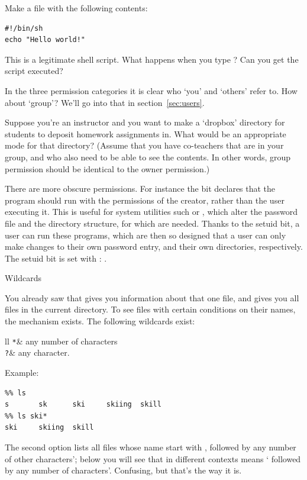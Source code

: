 Make a file  with the following contents:
\begin{lstlisting}
#!/bin/sh
echo "Hello world!"
\end{lstlisting}
This is a legitimate shell script. What happens when you type
? Can you get the script executed?

In the three permission categories it is clear who `you' and `others'
refer to. How about `group'? We'll go into that in section~\ref{sec:users}.

\begin{exercise}
  Suppose you're an instructor and you want to make a `dropbox'
  directory for students to deposit homework assignments in.
  What would be an appropriate mode for that directory?
  (Assume that you have co-teachers that are in your group,
  and who also need to be able to see the contents. In other words,
  group permission should be identical to the owner permission.)
\end{exercise}


\begin{remark}
  There are more obscure permissions. For instance the
   bit declares that the program should run with the
  permissions of the creator, rather than the user executing it. This
  is useful for system utilities such  or , which
  alter the password file and the directory structure, for which
   are needed. Thanks to the setuid
  bit, a user can run these programs, which are then so designed that
  a user can only make changes to their own password entry, and their
  own directories, respectively. The setuid bit is set with
  : .
\end{remark}

 {Wildcards}
\label{sec:shell-wildcard}

You already saw that  gives you information about that
one file, and  gives you all files in the current directory. To
see files with certain conditions on their names, the
 mechanism exists. The following wildcards exist:

\begin{fntable}{ll}
  \verb+*+& any number of characters\\
  \verb+?+& any character.\\
\end{fntable}

Example:
\begin{lstlisting}
%% ls
s       sk      ski     skiing  skill
%% ls ski*
ski     skiing  skill
\end{lstlisting}
The second option lists all files whose name start with
, followed by any number of other characters'; below you will
see that in different contexts  means ` followed by any
number of  characters'. Confusing, but that's the way it is.

